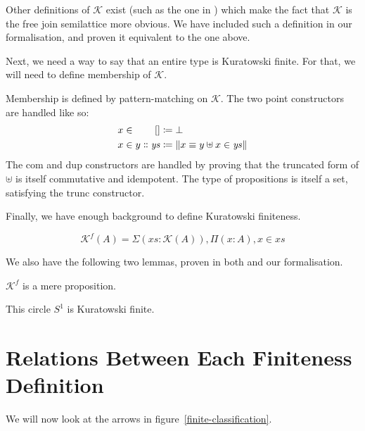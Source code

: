 Other definitions of \(\mathcal{K}\) exist (such as the one in
\cite{fruminFiniteSetsHomotopy2018}) which make the fact that \(\mathcal{K}\) is
the free join semilattice more obvious.
We have included such a definition in our formalisation, and proven it
equivalent to the one above.

Next, we need a way to say that an entire type is Kuratowski finite.
For that, we will need to define membership of \(\mathcal{K}\).
\begin{definition}
  Membership is defined by pattern-matching on \(\mathcal{K}\).
  The two point constructors are handled like so:
  \begin{equation}
    \begin{alignedat}{2}
      x \in&& \; []                      &\coloneqq \bot \\
      x \in&& \; y \dblcolon \mathit{ys} &\coloneqq \lVert x \equiv y \uplus x \in \mathit{ys} \rVert
    \end{alignedat}
  \end{equation}
  The \(\text{com}\) and \(\text{dup}\) constructors are handled by proving that
  the truncated form of \(\uplus\) is itself commutative and idempotent.
  The type of propositions is itself a set, satisfying the \(\text{trunc}\)
  constructor.
\end{definition}
Finally, we have enough background to define Kuratowski finiteness.
\begin{definition}
  \begin{equation}
    \mathcal{K}^{f}(A) = \Sigma {(\mathit{xs} : \mathcal{K}(A))} , \Pi (x : A) , x \in \mathit{xs}
  \end{equation}
\end{definition}

We also have the following two lemmas, proven in both
\cite{fruminFiniteSetsHomotopy2018} and our formalisation.
\begin{lemma}
  \(\mathcal{K}^f\) is a mere proposition.
\end{lemma}
\begin{lemma}
  This circle \(S^1\) is Kuratowski finite.
\end{lemma}
\section{Relations Between Each Finiteness Definition} \label{relations}
We will now look at the arrows in figure~\ref{finite-classification}.
